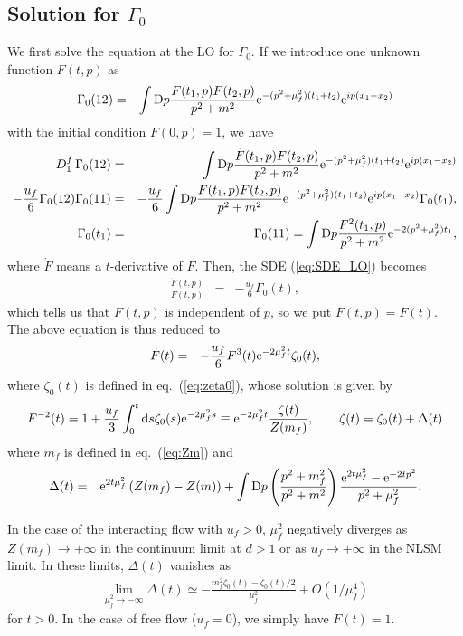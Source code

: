 \documentclass[preprint]{ptephy_v1}%
\newcommand{\rme}{{\rm e}}
\newcommand{\rmd}{{\rm d}}
\newcommand{\rmD}{{\rm D}}
\begin{document}
\subsection{Solution for $\Gamma_0$}
We first solve the equation at the LO for $\Gamma_0$. If we introduce one unknown function $F(t,p)$ as
\begin{eqnarray}
\Gamma_0(12) &=& \int \rmD p \frac{F(t_1,p) F(t_2, p)}{p^2+m^2} \rme^{-(p^2+\mu_f^2)(t_1+t_2)}\rme^{ip(x_1-x_2)}
\end{eqnarray}
with the initial condition $F(0,p) =1$, we have
\begin{eqnarray}
D_1^f \, \Gamma_0(12) &=&  \int \rmD p \frac{\dot F(t_1,p) F(t_2, p)}{p^2+m^2} \rme^{-(p^2+\mu_f^2)(t_1+t_2)}\rme^{ip(x_1-x_2)} \\
-\frac{u_f}{6}\Gamma_0(12)\Gamma_0(11) &=& -\frac{u_f}{6}  \int \rmD p \frac{F(t_1,p) F(t_2, p)}{p^2+m^2} \rme^{-(p^2+\mu_f^2)(t_1+t_2)}\rme^{ip(x_1-x_2)}\Gamma_0(t_1), \\
\Gamma_0(t_1) &=& \Gamma_0(11)= \int \rmD p \frac{F^2(t_1,p)}{p^2+m^2} \rme^{-2(p^2+\mu_f^2)t_1} ,
\end{eqnarray}
where $\dot F$ means a  $t$-derivative of $F$.
Then, the SDE (\ref{eq:SDE_LO}) becomes
\begin{eqnarray}
\frac{\dot F(t,p)}{F(t,p)} &=& -\frac{u_f}{6} \Gamma_0(t) ,
\end{eqnarray}
which tells us that $F(t,p)$ is independent  of $p$,  so we put  $F(t,p)=F(t)$.  The above equation is thus reduced to
\begin{eqnarray}
\dot F(t) &=& - \frac{u_f}{6}F^3(t) \rme^{-2\mu_f^2 t} \zeta_0(t), 
\end{eqnarray}
  where $\zeta_0(t)$ is defined in eq.~(\ref{eq:zeta0}),
whose solution is given by 
\begin{eqnarray}
F^{-2}(t) = 1+ \frac{u_f}{3}\int_0^t \rmd s \zeta_0(s) \rme^{-2\mu_f^2 s} \equiv \rme^{-2\mu_f^2 t} \frac{\zeta(t)}{Z(m_f)}, \qquad \zeta(t) =\zeta_0(t) +\Delta(t)
\label{eq:zeta}
\end{eqnarray}
where  $m_f$ is defined in eq.~(\ref{eq:Zm})  and
\begin{eqnarray}
\Delta(t) &=& \rme^{2t \mu_f^2} \left( Z(m_f) - Z(m) \right) +\int \rmD p \left(\frac{p^2+m_f^2}{p^2+m^2}\right)\frac{\rme^{2t\mu_f^2} -\rme^{-2t p^2}}{p^2+\mu_f^2} .
\end{eqnarray}

In the case of the interacting flow with $u_f > 0$, $\mu_f^2$ negatively diverges as $Z(m_f)\rightarrow+\infty $ in the continuum limit at $d > 1$ or as $u_f\rightarrow +\infty$ in the NLSM limit.
In these limits, $\Delta(t)$ vanishes as 
\begin{eqnarray}
\lim_{\mu_f^2\rightarrow -\infty} \Delta(t) \simeq -\frac{m_f^2 \zeta_0(t) -\dot \zeta_0(t)/2}{\mu_f^2}+O\left(1/\mu_f^4\right) 
\end{eqnarray}
for $t > 0$. In the case of free flow ($u_f=0$), we simply have $F(t)=1$.
\end{document}
